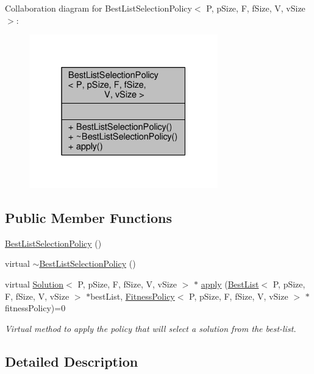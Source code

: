 Collaboration diagram for Best\+List\+Selection\+Policy$<$ P, p\+Size, F, f\+Size, V, v\+Size $>$\+:\nopagebreak
\begin{figure}[H]
\begin{center}
\leavevmode
\includegraphics[width=232pt]{classBestListSelectionPolicy__coll__graph}
\end{center}
\end{figure}
\subsection*{Public Member Functions}
\begin{DoxyCompactItemize}
\item 
\hyperlink{classBestListSelectionPolicy_a20a7af0bb2e775d20048ac5eb7d624ba}{Best\+List\+Selection\+Policy} ()
\item 
virtual \hyperlink{classBestListSelectionPolicy_a9b3f3d69b8bba7506e89eaf00b4d1c08}{$\sim$\+Best\+List\+Selection\+Policy} ()
\item 
virtual \hyperlink{classSolution}{Solution}$<$ P, p\+Size, F, f\+Size, V, v\+Size $>$ $\ast$ \hyperlink{classBestListSelectionPolicy_ae387a1ef0a3a597134edf198e5ab1299}{apply} (\hyperlink{classBestList}{Best\+List}$<$ P, p\+Size, F, f\+Size, V, v\+Size $>$ $\ast$best\+List, \hyperlink{classFitnessPolicy}{Fitness\+Policy}$<$ P, p\+Size, F, f\+Size, V, v\+Size $>$ $\ast$fitness\+Policy)=0
\begin{DoxyCompactList}\small\item\em Virtual method to apply the policy that will select a solution from the best-\/list. \end{DoxyCompactList}\end{DoxyCompactItemize}


\subsection{Detailed Description}
